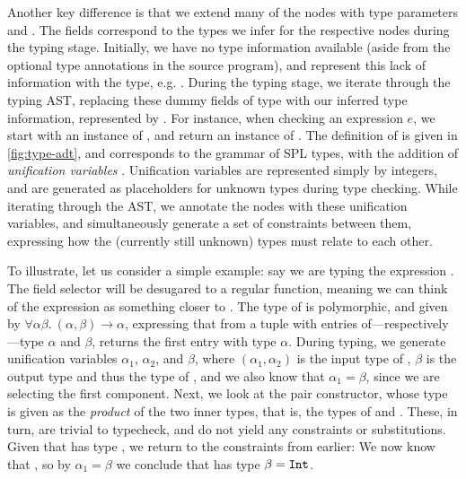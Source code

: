 Another key difference is that we extend many of the nodes with type
parameters  and . The fields correspond to the types we
infer for the respective nodes during the typing stage.
Initially, we have no type information available (aside from the optional type
annotations in the source program), and represent this lack of information
with the \haskell{()} type, e.g. . During the typing stage, we
iterate through the typing AST, replacing these dummy fields of type \haskell{()}
with our inferred type information, represented by .
For instance, when checking an expression $e$, we start with an instance of
, and return an instance of .
The definition of  is given in \cref{fig:type-adt}, and
corresponds to the grammar of SPL types, with the addition of \emph{unification
variables} .
Unification variables are represented simply by integers, and are generated as
placeholders for unknown types during type checking. While iterating through the
AST, we annotate the nodes with these unification variables, and simultaneously
generate a set of constraints between them, expressing how the (currently still
unknown) types must relate to each other.


To illustrate, let us consider a simple example: say we are typing the
expression . The field selector  will be desugared
to a regular function, meaning we can think of the expression as something
closer to . The type of  is polymorphic, and
given by $\forall \alpha \beta.\ (\alpha,\beta) \to \alpha$, expressing that
from a tuple with entries of---respectively---type $\alpha$ and $\beta$,
 returns the first entry with type $\alpha$.
During typing, we generate unification variables $\alpha_1$, $\alpha_2$, and
$\beta$, where $(\alpha_1,\alpha_2)$ is the input type of , $\beta$
is the output type and thus the type of , and we also know
that $\alpha_1 = \beta$, since we are selecting the first component.
Next, we look at the pair constructor, whose type is given as the \emph{product}
of the two inner types, that is, the types of  and .
These, in turn, are trivial to typecheck, and do not yield any constraints or
substitutions. Given that  has type , we return
to the constraints from earlier:
We now know that , so by
$\alpha_1 = \beta$ we conclude that  has type
$\beta = \texttt{Int}$.

